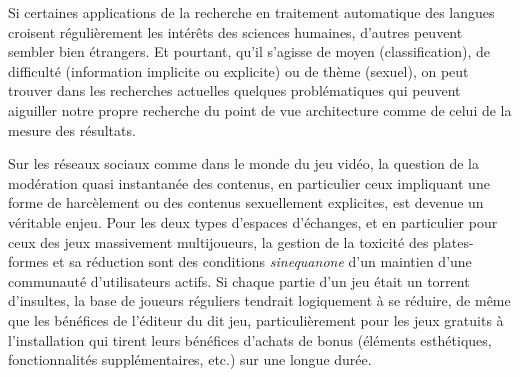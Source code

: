 
Si certaines applications de la recherche en traitement automatique des langues croisent régulièrement les intérêts des sciences humaines, d'autres peuvent sembler bien étrangers. Et pourtant, qu'il s'agisse de moyen (classification), de difficulté (information implicite ou explicite) ou de thème (sexuel), on peut trouver dans les recherches actuelles quelques problématiques qui peuvent aiguiller notre propre recherche du point de vue architecture comme de celui de la mesure des résultats. 

Sur les réseaux sociaux comme dans le monde du jeu vidéo, la question de la modération quasi instantanée des contenus, en particulier ceux impliquant une forme de harcèlement ou des contenus sexuellement explicites, est devenue un véritable enjeu. Pour les deux types d'espaces d'échanges, et en particulier pour ceux des jeux massivement multijoueurs, la gestion de la toxicité des plates-formes et sa réduction sont des conditions \textit{sinequanone} d'un maintien d'une communauté d'utilisateurs actifs. Si chaque partie d'un jeu était un torrent d'insultes, la base de joueurs réguliers tendrait logiquement à se réduire, de même que les bénéfices de l'éditeur du dit jeu, particulièrement pour les jeux gratuits à l'installation qui tirent leurs bénéfices d'achats de bonus (éléments esthétiques, fonctionnalités supplémentaires, etc.) sur une longue durée. 

